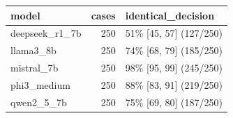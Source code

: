 \begin{tabular}{lrl}
\toprule
model & cases & identical\_decision \\
\midrule
deepseek\_r1\_7b & 250 & 51\% [45, 57] (127/250) \\
llama3\_8b & 250 & 74\% [68, 79] (185/250) \\
mistral\_7b & 250 & 98\% [95, 99] (245/250) \\
phi3\_medium & 250 & 88\% [83, 91] (219/250) \\
qwen2\_5\_7b & 250 & 75\% [69, 80] (187/250) \\
\bottomrule
\end{tabular}
